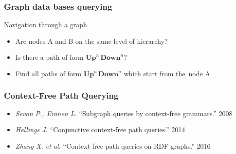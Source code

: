 \documentclass[xcolor=table]{beamer}
\begin{document}
\begin{frame} \frametitle{Graph data bases querying}

  \begin{minipage}[m]{0.45\linewidth}
  \end{minipage}\hfill
  \begin{minipage}[m]{0.5\linewidth}
  Navigation through a graph
  \begin{itemize}
        \item Are nodes A and B on the same level of hierarchy?
        \item Is there a path of form $\textbf{Up}^n \, \textbf{Down}^n$?
        \item Find all paths of form $\textbf{Up}^n \, \textbf{Down}^n$ which start from the~node A
  \end{itemize}

  \end{minipage}


\end{frame}

\begin{frame}[fragile]
  \frametitle{Context-Free Path Querying}
    \begin{itemize}
        \item \emph{Sevon P., Eronen L.} ``Subgraph queries by context-free grammars.'' 2008
        \item \emph{Hellings J.} ``Conjunctive context-free path queries.'' 2014
        \item \emph{Zhang X. et al.} ``Context-free path queries on RDF graphs.'' 2016
    \end{itemize}
\end{frame}
\end{document}
